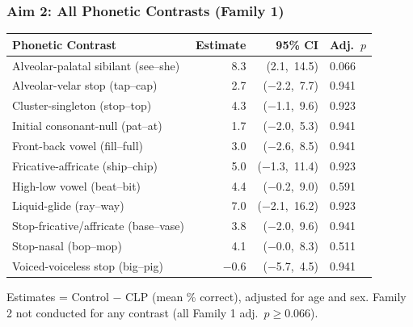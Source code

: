 \documentclass{beamer}
\begin{document}
\begin{frame}
\frametitle{Aim 2: All Phonetic Contrasts (Family 1)}
\vspace{0.1em}
\renewcommand{\arraystretch}{1.1}
\begin{center}
\tiny
\begin{tabular}{@{}lrrl@{}}
\toprule
\textbf{Phonetic Contrast} & \textbf{Estimate} & \textbf{95\% CI} & \textbf{Adj.\ \(p\)} \\
\midrule
Alveolar-palatal sibilant (see--she)     &  8.3 & (2.1,\ 14.5)    & 0.066 \\
Alveolar-velar stop (tap--cap)           &  2.7 & ($-$2.2,\ 7.7)  & 0.941 \\
Cluster-singleton (stop--top)            &  4.3 & ($-$1.1,\ 9.6)  & 0.923 \\
Initial consonant-null (pat--at)         &  1.7 & ($-$2.0,\ 5.3)  & 0.941 \\
Front-back vowel (fill--full)            &  3.0 & ($-$2.6,\ 8.5)  & 0.941 \\
Fricative-affricate (ship--chip)         &  5.0 & ($-$1.3,\ 11.4) & 0.923 \\
High-low vowel (beat--bit)               &  4.4 & ($-$0.2,\ 9.0)  & 0.591 \\
Liquid-glide (ray--way)                  &  7.0 & ($-$2.1,\ 16.2) & 0.923 \\
Stop-fricative/affricate (base--vase)    &  3.8 & ($-$2.0,\ 9.6)  & 0.941 \\
Stop-nasal (bop--mop)                    &  4.1 & ($-$0.0,\ 8.3)  & 0.511 \\
Voiced-voiceless stop (big--pig)         & $-$0.6 & ($-$5.7,\ 4.5) & 0.941 \\
\bottomrule
\end{tabular}
\end{center}
\normalsize
\vspace{0.2em}
{\small Estimates = Control $-$ CLP (mean \% correct), adjusted for age and sex. Family 2 not conducted for any contrast (all Family 1 adj.\ $p \geq 0.066$).}
\end{frame}
\end{document}
